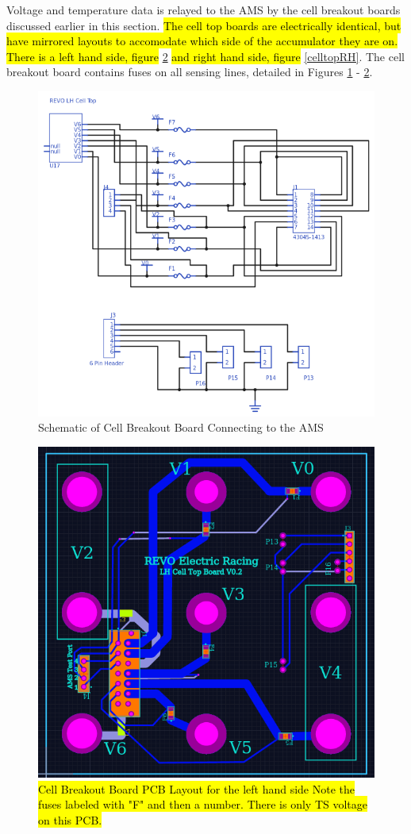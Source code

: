\documentclass{article}
\DeclareRobustCommand{\hlr}[1]{{\sethlcolor{red}\hl{#1}}}
\begin{document}
            Voltage and temperature data is relayed to the AMS by the cell breakout boards discussed earlier in this section. \hlr{The cell top boards are electrically identical, but have mirrored layouts to accomodate which side of the accumulator they are on. There is a left hand side, figure} \ref{celltopLH}\hlr{ and right hand side, figure} \ref{celltopRH}. The cell breakout board contains fuses on all sensing lines, detailed in Figures \ref{celltopschem} - \ref{celltopLH}.

            \begin{figure}[H]
                \centering
                \includegraphics[width = 0.8 \textwidth]{CellTopSchem}
                \caption{Schematic of Cell Breakout Board Connecting to the AMS}
                \label{celltopschem}
            \end{figure}


            \begin{figure}[H]
                \centering
                \includegraphics[width = 0.4 \textwidth]{CellTopLH}
                \caption{\hlr{Cell Breakout Board PCB Layout for the left hand side Note the fuses labeled with "F" and then a number. There is only TS voltage on this PCB.}} %
                \label{celltopLH}
            \end{figure}
\end{document}
